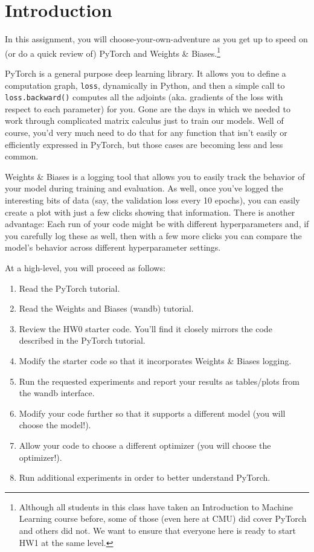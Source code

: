 \documentclass[11pt,addpoints,answers]{exam}
\begin{document}
\begin{center}
    \pointtable[v][questions]
\end{center}\clearpage

%

\section*{Introduction}
\label{sec:intro}
In this assignment, you will choose-your-own-adventure as you get up to speed on (or do a quick review of) PyTorch and Weights \& Biases.\footnote{Although all students in this class have taken an Introduction to Machine Learning course before, some of those (even here at CMU) did cover PyTorch and others did not. We want to ensure that everyone here is ready to start HW1 at the same level.}


PyTorch is a general purpose deep learning library. It allows you to define a computation graph, \lstinline{loss}, dynamically in Python, and then a simple call to \lstinline{loss.backward()} computes all the adjoints (aka. gradients of the loss with respect to each parameter) for you. Gone are the days in which we needed to work through complicated matrix calculus just to train our models. Well of course, you'd very much need to do that for any function that isn't easily or efficiently expressed in PyTorch, but those cases are becoming less and less common. 

Weights \& Biases is a logging tool that allows you to easily track the behavior of your model during training and evaluation. As well, once you've logged the interesting bits of data (say, the validation loss every 10 epochs), you can easily create a plot with just a few clicks showing that information. There is another advantage: Each run of your code might be with different hyperparameters and, if you carefully log these as well, then with a few more clicks you can compare the model's behavior across different hyperparameter settings.

At a high-level, you will proceed as follows:

\begin{enumerate}
\item Read the PyTorch tutorial.
\item Read the Weights and Biases (wandb) tutorial.
\item Review the HW0 starter code. You'll find it closely mirrors the code described in the PyTorch tutorial.
\item Modify the starter code so that it incorporates Weights \& Biases logging.
\item Run the requested experiments and report your results as tables/plots from the wandb interface.
\item Modify your code further so that it supports a different model (you will choose the model!).
\item Allow your code to choose a different optimizer (you will choose the optimizer!).
\item Run additional experiments in order to better understand PyTorch.
\end{enumerate}
\end{document}
